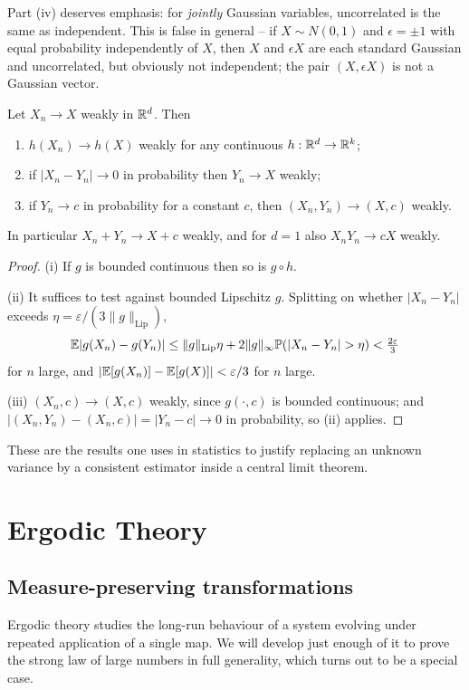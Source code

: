\documentclass[a4paper]{scrartcl}
\begin{document}
Part (iv) deserves emphasis: for \emph{jointly} Gaussian variables, uncorrelated is the same as independent. This is false in general -- if $X\sim N(0,1)$ and $\epsilon = \pm1$ with equal probability independently of $X$, then $X$ and $\epsilon X$ are each standard Gaussian and uncorrelated, but obviously not independent; the pair $(X,\epsilon X)$ is not a Gaussian vector.

\begin{proposition}\label{prop:slutsky}
	Let $X_n \to X$ weakly in $\mathbb{R}^d$. Then
	\begin{enumerate}[label=(\roman*)]
		\item $h(X_n)\to h(X)$ weakly for any continuous $h : \mathbb{R}^d\to\mathbb{R}^k$;
		\item if $|X_n - Y_n|\to0$ in probability then $Y_n \to X$ weakly;
		\item if $Y_n \to c$ in probability for a constant $c$, then $(X_n,Y_n)\to(X,c)$ weakly.
	\end{enumerate}
	In particular $X_n + Y_n \to X+c$ weakly, and for $d=1$ also $X_nY_n \to cX$ weakly.
\end{proposition}
\begin{proof}
	(i) If $g$ is bounded continuous then so is $g\circ h$.

	(ii) It suffices to test against bounded Lipschitz $g$. Splitting on whether $|X_n - Y_n|$ exceeds $\eta = \varepsilon/(3\|g\|_{\mathrm{Lip}})$,
	$$
	\EE|g(X_n)-g(Y_n)| \leq \|g\|_{\mathrm{Lip}}\eta + 2\|g\|_\infty\PP(|X_n-Y_n|>\eta)<\tfrac{2\varepsilon}{3}
	$$
	for $n$ large, and $|\mathbb{E}[g(X_n)]-\mathbb{E}[g(X)]|<\varepsilon/3$ for $n$ large.

	(iii) $(X_n,c)\to(X,c)$ weakly, since $g(\cdot,c)$ is bounded continuous; and $|(X_n,Y_n)-(X_n,c)|=|Y_n-c|\to0$ in probability, so (ii) applies.
\end{proof}

These are the results one uses in statistics to justify replacing an unknown variance by a consistent estimator inside a central limit theorem.
\section{Ergodic Theory}

\subsection{Measure-preserving transformations}

Ergodic theory studies the long-run behaviour of a system evolving under repeated application of a single map. We will develop just enough of it to prove the strong law of large numbers in full generality, which turns out to be a special case.
\end{document}
